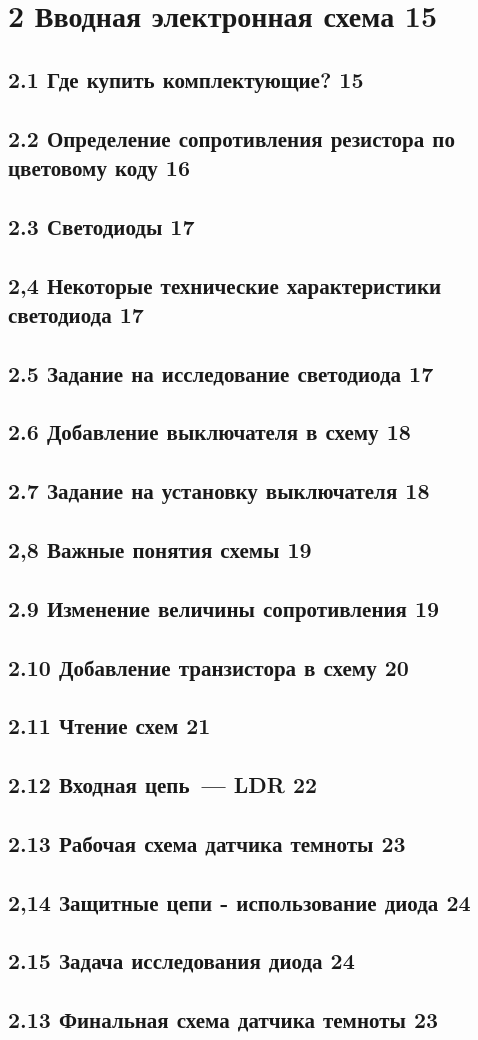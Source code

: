 
\chapter{2 Вводная электронная схема 15}

\section{2.1 Где купить комплектующие? 15}
\section{2.2 Определение сопротивления резистора по цветовому коду 16}
\section{2.3 Светодиоды 17}
\section{2,4 Некоторые технические характеристики светодиода 17}
\section{2.5 Задание на исследование светодиода 17}
\section{2.6 Добавление выключателя  в схему 18}
\section{2.7 Задание на установку выключателя 18}
\section{2,8 Важные понятия схемы 19}
\section{2.9 Изменение величины сопротивления 19}
\section{2.10 Добавление транзистора в схему 20}
\section{2.11 Чтение схем 21}
\section{2.12 Входная цепь\ --- LDR 22}
\section{2.13 Рабочая схема датчика темноты 23}
\section{2,14 Защитные цепи - использование диода 24}
\section{2.15 Задача исследования диода 24}
\section{2.13 Финальная схема датчика темноты 23}

